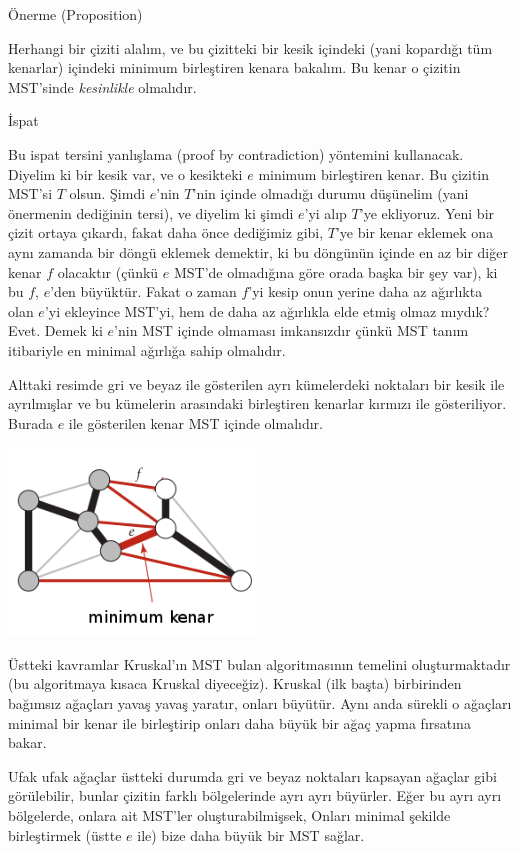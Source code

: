 \documentclass[12pt,fleqn]{article}\usepackage{../../common}
\begin{document}
Önerme (Proposition)

Herhangi bir çiziti alalım, ve bu çizitteki bir kesik içindeki (yani
kopardığı tüm kenarlar) içindeki minimum birleştiren kenara bakalım. Bu
kenar o çizitin MST'sinde {\em kesinlikle} olmalıdır.

İspat

Bu ispat tersini yanlışlama (proof by contradiction) yöntemini
kullanacak. Diyelim ki bir kesik var, ve o kesikteki $e$ minimum
birleştiren kenar. Bu çizitin MST'si $T$ olsun. Şimdi $e$'nin $T$'nin
içinde olmadığı durumu düşünelim (yani önermenin dediğinin tersi), ve
diyelim ki şimdi $e$'yi alıp $T$'ye ekliyoruz. Yeni bir çizit ortaya
çıkardı, fakat daha önce dediğimiz gibi, $T$'ye bir kenar eklemek ona aynı
zamanda bir döngü eklemek demektir, ki bu döngünün içinde en az bir diğer
kenar $f$ olacaktır (çünkü $e$ MST'de olmadığına göre orada başka bir şey
var), ki bu $f$, $e$'den büyüktür. Fakat o zaman $f$'yi kesip onun yerine
daha az ağırlıkta olan $e$'yi ekleyince MST'yi, hem de daha az ağırlıkla
elde etmiş olmaz mıydık? Evet. Demek ki $e$'nin MST içinde olmaması
imkansızdır çünkü MST tanım itibariyle en minimal ağırlığa sahip olmalıdır.

Alttaki resimde gri ve beyaz ile gösterilen ayrı kümelerdeki noktaları bir
kesik ile ayrılmışlar ve bu kümelerin arasındaki birleştiren kenarlar
kırmızı ile gösteriliyor. Burada $e$ ile gösterilen kenar MST içinde
olmalıdır. 

\includegraphics[height=5cm]{cross_edge.png}

Üstteki kavramlar Kruskal'ın MST bulan algoritmasının temelini
oluşturmaktadır (bu algoritmaya kısaca Kruskal diyeceğiz). Kruskal (ilk
başta) birbirinden bağımsız ağaçları yavaş yavaş yaratır, onları
büyütür. Aynı anda sürekli o ağaçları minimal bir kenar ile birleştirip
onları daha büyük bir ağaç yapma fırsatına bakar. 

Ufak ufak ağaçlar üstteki durumda gri ve beyaz noktaları kapsayan ağaçlar
gibi görülebilir, bunlar çizitin farklı bölgelerinde ayrı ayrı
büyürler. Eğer bu ayrı ayrı bölgelerde, onlara ait MST'ler
oluşturabilmişsek, Onları minimal şekilde birleştirmek (üstte $e$ ile) bize
daha büyük bir MST sağlar. 
\end{document}
